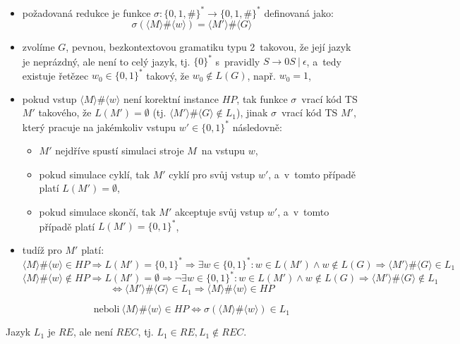 \documentclass[a4paper, 11pt]{article}
\begin{document}
\begin{itemize}
    \item požadovaná redukce je funkce $\sigma : \{ 0, 1, \# \}^* \rightarrow \{ 0, 1, \# \}^*$ definovaná jako:
    $$\sigma ( \langle M \rangle \# \langle w \rangle ) = \langle M' \rangle \# \langle G \rangle$$
    \item zvolíme $G$, pevnou, bezkontextovou gramatiku typu 2~takovou, že její jazyk je neprázdný, ale není to celý jazyk, tj. $\{ 0 \}^*$ s~pravidly $S \rightarrow 0S\ |\ \epsilon$, a~tedy existuje řetězec $w_0 \in \{ 0, 1 \}^*$ takový, že $w_0 \notin L(G)$, např. $w_0 = 1$,
    \item pokud vstup $\langle M \rangle \# \langle w \rangle$ není korektní instance $HP$, tak funkce $\sigma$~vrací kód TS $M'$ takového, že $L(M') = \emptyset$ (tj. $\langle M' \rangle \# \langle G \rangle \notin L_1$), jinak $\sigma$~vrací kód TS $M'$, který pracuje na jakémkoliv vstupu $w' \in \{ 0, 1 \}^*$ následovně:
    \begin{itemize}
        \item $M'$ nejdříve spustí simulaci stroje $M$~na vstupu $w$,
        \item pokud simulace cyklí, tak $M'$ cyklí pro svůj vstup $w'$, a~v~tomto případě platí $L(M') = \emptyset$,
        \item pokud simulace skončí, tak $M'$ akceptuje svůj vstup $w'$, a~v~tomto případě platí $L(M') = \{ 0, 1 \}^*$,
    \end{itemize}
    \item tudíž pro $M'$ platí:
    $$\langle M \rangle \# \langle w \rangle \in HP \Rightarrow L(M') = \{ 0, 1 \}^* \Rightarrow \exists w \in \{ 0, 1 \}^* : w \in L(M') \wedge w \notin L(G) \Rightarrow \langle M' \rangle \# \langle G \rangle \in L_1$$
    $$\langle M \rangle \# \langle w \rangle \notin HP \Rightarrow L(M') = \emptyset \Rightarrow \neg \exists w \in \{ 0, 1 \}^* : w \in L(M') \wedge w \notin L(G) \Rightarrow \langle M' \rangle \# \langle G \rangle \notin L_1$$
    $$\Longleftrightarrow \langle M' \rangle \# \langle G \rangle \in L_1 \Rightarrow \langle M \rangle \# \langle w \rangle \in HP$$

    $$\textrm{neboli}\ \langle M \rangle \# \langle w \rangle \in HP \Longleftrightarrow \sigma ( \langle M \rangle \# \langle w \rangle ) \in L_1$$
\end{itemize}
Jazyk $L_1$ je $RE$, ale není $REC$, tj. $L_1 \in RE, L_1 \notin REC$.

\newpage
\end{document}
